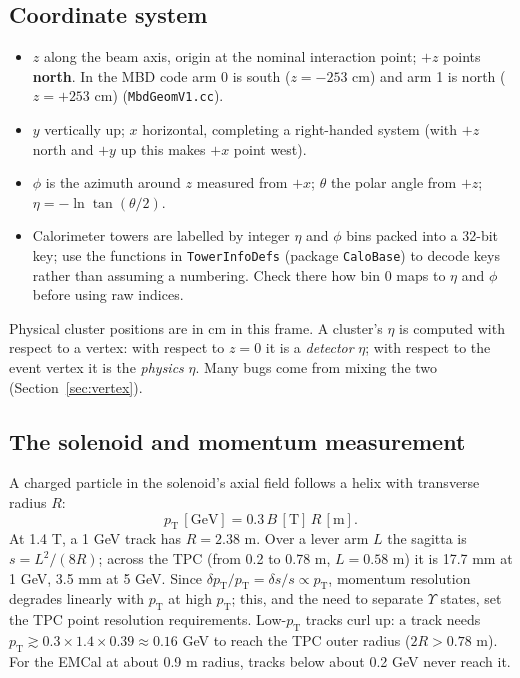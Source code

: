 \documentclass[11pt,letterpaper]{article}
\newcommand{\pT}{p_{\mathrm{T}}}
\begin{document}
\subsection{Coordinate system}
\begin{itemize}
\item $z$ along the beam axis, origin at the nominal interaction point; $+z$ points \textbf{north}. In the MBD code arm 0 is
south ($z=-253$ cm) and arm 1 is north ($z=+253$ cm) (\texttt{MbdGeomV1.cc}).
\item $y$ vertically up; $x$ horizontal, completing a right-handed system (with $+z$ north and $+y$ up this makes $+x$ point west).
\item $\phi$ is the azimuth around $z$ measured from $+x$; $\theta$ the polar angle from $+z$; $\eta=-\ln\tan(\theta/2)$.
\item Calorimeter towers are labelled by integer $\eta$ and $\phi$ bins packed into a 32-bit key; use the functions in
\texttt{TowerInfoDefs} (package \texttt{CaloBase}) to decode keys rather than assuming a numbering. Check there how bin 0 maps to
$\eta$ and $\phi$ before using raw indices.
\end{itemize}
Physical cluster positions are in cm in this frame. A cluster's $\eta$ is computed with respect to a vertex: with respect to
$z=0$ it is a \emph{detector} $\eta$; with respect to the event vertex it is the \emph{physics} $\eta$. Many bugs come from
mixing the two (Section~\ref{sec:vertex}).

\subsection{The solenoid and momentum measurement}
A charged particle in the solenoid's axial field follows a helix with transverse radius $R$:
\begin{equation}
\pT\,[\mathrm{GeV}]=0.3\,B\,[\mathrm T]\,R\,[\mathrm m].
\end{equation}
At 1.4 T, a 1 GeV track has $R=2.38$ m. Over a lever arm $L$ the sagitta is $s=L^2/(8R)$; across the TPC (from 0.2 to 0.78 m,
$L=0.58$ m) it is 17.7 mm at 1 GeV, 3.5 mm at 5 GeV. Since $\delta\pT/\pT=\delta s/s\propto\pT$, momentum resolution degrades
linearly with $\pT$ at high $\pT$; this, and the need to separate $\Upsilon$ states, set the TPC point resolution requirements.
Low-$\pT$ tracks curl up: a track needs $\pT\gtrsim0.3\times1.4\times0.39\approx0.16$ GeV to reach the TPC outer radius ($2R>0.78$ m).
For the EMCal at about 0.9 m radius, tracks below about 0.2 GeV never reach it.
\end{document}
